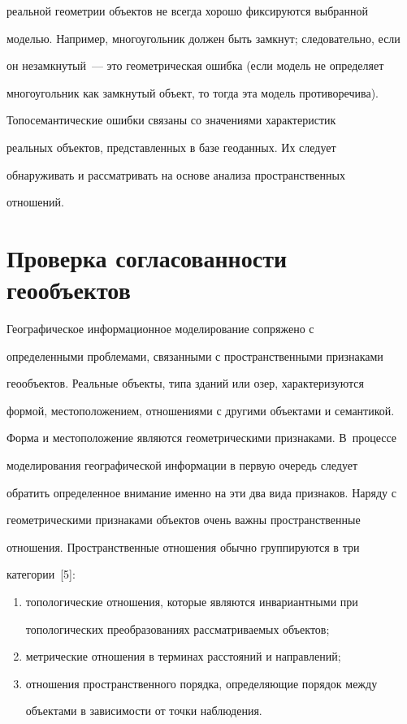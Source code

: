 реальной геометрии объектов не всегда хорошо фиксируются выбранной 


моделью. Например, многоугольник должен быть замкнут; следовательно, если 


он не\-замк\-ну\-тый~--- это геометрическая ошибка (если модель не определяет 


многоугольник как замкнутый объект, то тогда эта модель противоречива). 


    


    Топосемантические ошибки связаны со значениями характеристик 


реальных объектов, представленных в базе геоданных. Их следует 


обнаруживать и рассматривать на основе анализа пространственных 


отношений. 





\section{Проверка согласованности геообъектов}


    


    Географическое информационное моделирование сопряжено с 


определенными проблемами, связанными с пространственными признаками 


геообъектов. Реальные объекты, типа зданий или озер, характеризуются 


формой, местоположением, отношениями с другими объектами и семантикой. 


Форма и местоположение являются геометрическими признаками. В~процессе 


моделирования географической информации в первую очередь следует 


обратить определенное внимание именно на эти два вида признаков. Наряду с 


геометрическими признаками объектов очень важны пространственные 


отношения. Пространственные отношения обычно группируются в три 


категории~[5]: 


    \begin{enumerate}[(1)]


\item топологические отношения, которые являются инвариантными при 


топологических преобразованиях рассматриваемых объектов;


\item метрические отношения в терминах расстояний и направлений;


\item отношения пространственного порядка, определяющие порядок между 


объектами в зависимости от точки наблюдения. 


\end{enumerate}





